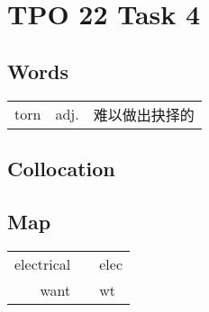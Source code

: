 \section{TPO 22 Task 4}

\subsection{Words}

\begin{tabular}{lll}
    torn & adj. & 难以做出抉择的 \\
\end{tabular}

\subsection{Collocation}

\subsection{Map}

\begin{tabular}{rc@{\quad$\to$\quad}l}
    electrical &  & elec \\
    want       &  & wt   \\
\end{tabular}

\newpage
